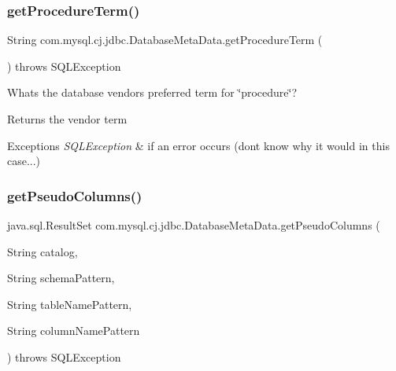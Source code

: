 \subsubsection{\texorpdfstring{get\+Procedure\+Term()}{getProcedureTerm()}}
{\footnotesize\ttfamily String com.\+mysql.\+cj.\+jdbc.\+Database\+Meta\+Data.\+get\+Procedure\+Term (\begin{DoxyParamCaption}{ }\end{DoxyParamCaption}) throws S\+Q\+L\+Exception}

What\textquotesingle{}s the database vendor\textquotesingle{}s preferred term for \char`\"{}procedure\char`\"{}?

\begin{DoxyReturn}{Returns}
the vendor term 
\end{DoxyReturn}

\begin{DoxyExceptions}{Exceptions}
{\em S\+Q\+L\+Exception} & if an error occurs (don\textquotesingle{}t know why it would in this case...) \\
\hline
\end{DoxyExceptions}
\mbox{\label{classcom_1_1mysql_1_1cj_1_1jdbc_1_1_database_meta_data_a73c07590f0e4126b32717521f8e2c4f6}} 
\subsubsection{\texorpdfstring{get\+Pseudo\+Columns()}{getPseudoColumns()}}
{\footnotesize\ttfamily java.\+sql.\+Result\+Set com.\+mysql.\+cj.\+jdbc.\+Database\+Meta\+Data.\+get\+Pseudo\+Columns (\begin{DoxyParamCaption}\item[{String}]{catalog,  }\item[{String}]{schema\+Pattern,  }\item[{String}]{table\+Name\+Pattern,  }\item[{String}]{column\+Name\+Pattern }\end{DoxyParamCaption}) throws S\+Q\+L\+Exception}

\mbox{\label{classcom_1_1mysql_1_1cj_1_1jdbc_1_1_database_meta_data_adf86d6bb0db14b9abb64497d8b14b743}} 
